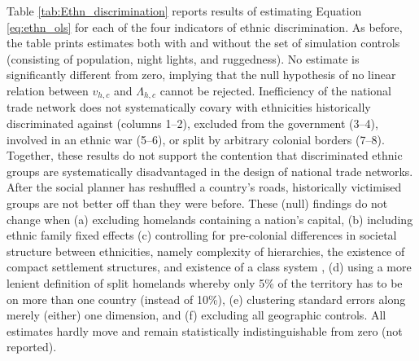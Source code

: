 \documentclass[11pt, oneside]{article}   	%
\begin{document}
Table \eqref{tab:Ethn_discrimination} reports results of estimating Equation \eqref{eq:ethn_ols} for each of the four indicators of ethnic discrimination. As before, the table prints estimates both with and without the set of simulation controls (consisting of population, night lights, and ruggedness). No estimate is significantly different from zero, implying that the null hypothesis of no linear relation between $v_{h,c}$ and $\Lambda_{h,c}$ cannot be rejected. Inefficiency of the national trade network does not systematically covary with ethnicities historically discriminated against (columns 1--2), excluded from the government (3--4), involved in an ethnic war (5--6), or split by arbitrary colonial borders (7--8). Together, these results do not support the contention that discriminated ethnic groups are systematically disadvantaged in the design of national trade networks. After the social planner has reshuffled a country's roads, historically victimised groups are not better off than they were before. These (null) findings do not change when (a) excluding homelands containing a nation's capital, (b) including ethnic family fixed effects (c) controlling for pre-colonial differences in societal structure between ethnicities, namely complexity of hierarchies, the existence of compact settlement structures, and existence of a class system \citep{michalopoulos_pre-colonial_2013}, (d) using a more lenient definition of split homelands whereby only 5\% of the territory has to be on more than one country (instead of 10\%), (e) clustering standard errors along merely (either) one dimension, and (f) excluding all geographic controls. All estimates hardly move and remain statistically indistinguishable from zero (not reported).
\end{document}
